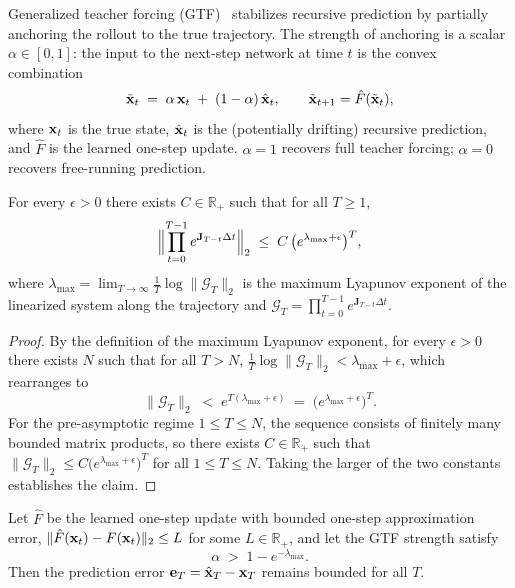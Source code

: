 Generalized teacher forcing (GTF)~\cite{Hess2023-kp} stabilizes recursive prediction by partially anchoring the rollout to the true trajectory. The strength of anchoring is a scalar $\alpha\in[0,1]$: the input to the next-step network at time $t$ is the convex combination
\begin{equation}
\tilde{\vb{x}}_{t} \;=\; \alpha\,\vb{x}_{t}\;+\;(1-\alpha)\,\hat{\vb{x}}_{t}, \qquad \tilde{\vb{x}}_{t+1}=\hat{F}(\tilde{\vb{x}}_{t}),
\end{equation}
where $\vb{x}_{t}$ is the true state, $\hat{\vb{x}}_{t}$ is the (potentially drifting) recursive prediction, and $\hat{F}$ is the learned one-step update. $\alpha=1$ recovers full teacher forcing; $\alpha=0$ recovers free-running prediction.

\begin{lemma}\label{lem:supp-interareal-control-lyap-prod}
For every $\epsilon>0$ there exists $C\in\mathbb{R}_{+}$ such that for all $T\geq 1$,
\begin{equation}
\Bigl\|\prod_{t=0}^{T-1} e^{\mathbf{J}_{T-t}\Delta t}\Bigr\|_{2} \;\leq\; C\,\bigl(e^{\lambda_{\max}+\epsilon}\bigr)^{T},
\end{equation}
where $\lambda_{\max}=\lim_{T\to\infty}\frac{1}{T}\log\|\mathcal{G}_{T}\|_{2}$ is the maximum Lyapunov exponent of the linearized system along the trajectory and $\mathcal{G}_{T}=\prod_{t=0}^{T-1}e^{\mathbf{J}_{T-t}\Delta t}$.
\end{lemma}

\begin{proof}
By the definition of the maximum Lyapunov exponent, for every $\epsilon>0$ there exists $N$ such that for all $T>N$, $\frac{1}{T}\log\|\mathcal{G}_{T}\|_{2} < \lambda_{\max}+\epsilon$, which rearranges to
\begin{equation}
\|\mathcal{G}_{T}\|_{2} \;<\; e^{T(\lambda_{\max}+\epsilon)} \;=\; \bigl(e^{\lambda_{\max}+\epsilon}\bigr)^{T}.
\end{equation}
For the pre-asymptotic regime $1\leq T\leq N$, the sequence consists of finitely many bounded matrix products, so there exists $C\in\mathbb{R}_{+}$ such that $\|\mathcal{G}_{T}\|_{2}\leq C\bigl(e^{\lambda_{\max}+\epsilon}\bigr)^{T}$ for all $1\leq T\leq N$. Taking the larger of the two constants establishes the claim. \end{proof}

\begin{proposition}\label{prop:supp-interareal-control-gtf}
Let $\hat{F}$ be the learned one-step update with bounded one-step approximation error, $\|\hat{F}(\vb{x}_{t})-F(\vb{x}_{t})\|_{2}\leq L$ for some $L\in\mathbb{R}_{+}$, and let the GTF strength satisfy
\begin{equation}
\alpha \;>\; 1 - e^{-\lambda_{\max}}.\label{eq:supp-interareal-control-gtf-bound}
\end{equation}
Then the prediction error $\vb{e}_{T}=\hat{\vb{x}}_{T}-\vb{x}_{T}$ remains bounded for all $T$.
\end{proposition}

